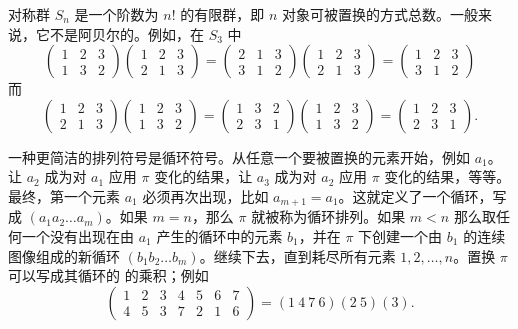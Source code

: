 对称群 $S_n$ 是一个阶数为 $n!$ 的有限群，即 $n$ 对象可被置换的方式总数。一般来说，它不是阿贝尔的。例如，在 $S_3$ 中
$$
\left(\begin{array}{lll}
1 & 2 & 3 \\
1 & 3 & 2
\end{array}\right)\left(\begin{array}{lll}
1 & 2 & 3 \\
2 & 1 & 3
\end{array}\right)=\left(\begin{array}{lll}
2 & 1 & 3 \\
3 & 1 & 2
\end{array}\right)\left(\begin{array}{lll}
1 & 2 & 3 \\
2 & 1 & 3
\end{array}\right)=\left(\begin{array}{lll}
1 & 2 & 3 \\
3 & 1 & 2
\end{array}\right)
$$
而
$$
\left(\begin{array}{lll}
1 & 2 & 3 \\
2 & 1 & 3
\end{array}\right)\left(\begin{array}{lll}
1 & 2 & 3 \\
1 & 3 & 2
\end{array}\right)=\left(\begin{array}{lll}
1 & 3 & 2 \\
2 & 3 & 1
\end{array}\right)\left(\begin{array}{lll}
1 & 2 & 3 \\
1 & 3 & 2
\end{array}\right)=\left(\begin{array}{lll}
1 & 2 & 3 \\
2 & 3 & 1
\end{array}\right) .
$$

一种更简洁的排列符号是循环符号。从任意一个要被置换的元素开始，例如 $a_1$。让 $a_2$ 成为对 $a_1$ 应用 $\pi$ 变化的结果，让 $a_3$ 成为对 $a_2$ 应用 $\pi$ 变化的结果，等等。最终，第一个元素 $a_1$ 必须再次出现，比如 $a_{m+1}=a_1$。这就定义了一个循环，写成 $\left(a_1 a_2\ldots a_m\right)$。如果 $m=n$，那么 $\pi$ 就被称为循环排列。如果 $m<n$ 那么取任何一个没有出现在由 $a_1$ 产生的循环中的元素 $b_1$，并在 $\pi$ 下创建一个由 $b_1$ 的连续图像组成的新循环 $\left(b_1 b_2\ldots b_m\right)$。继续下去，直到耗尽所有元素 $1, 2,\dots, n$。置换 \(\pi\)可以写成其循环的 的乘积；例如
$$
\begin{pmatrix}1&2&3&4&5&6&7\\4&5&3&7&2&1&6\end{pmatrix}=(1\:4\:7\:6)(2\:5)(3).
$$

